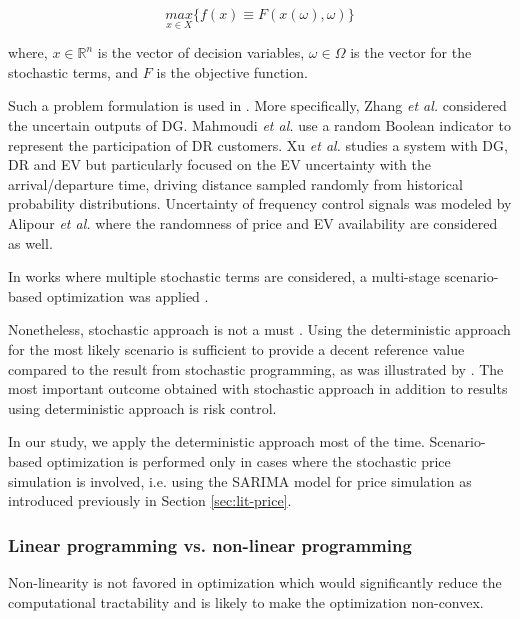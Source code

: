 \begin{equation*}
\underset{x\in X}{max}\{ f(x) \equiv F(x(\omega),\omega)\}
\end{equation*}

where, $x \in \mathbb{R}^n$ is the vector of decision variables, $\omega \in  \Omega$ is the vector for the stochastic terms, and $F$ is the objective function. 

Such a problem formulation is used in \cite{Zhang2016,Alipour2017,Mahmoudi2017,Xu2017,Han2017,Calvillo2016,Mahmoudi2014}. More specifically, Zhang \textit{et al.} \cite{Zhang2016} considered the uncertain outputs of DG. Mahmoudi \textit{et al.} \cite{Mahmoudi2017} use a random Boolean indicator to represent the participation of DR customers. Xu \textit{et al.} \cite{Xu2017} studies a system with DG, DR and EV but particularly focused on the EV uncertainty with the arrival/departure time, driving distance sampled randomly from historical probability distributions. Uncertainty of frequency control signals was modeled by Alipour \textit{et al.} \cite{Alipour2017} where the randomness of price and EV availability are considered as well. 

In works where multiple stochastic terms are considered, a multi-stage scenario-based optimization was applied \cite{Alipour2017,Han2017}.

Nonetheless, stochastic approach is not a must \cite{Zucker2013}. Using the deterministic approach for the most likely scenario is sufficient to provide a decent reference value compared to the result from stochastic programming, as was illustrated by \cite{Calvillo2016}. The most important outcome obtained with stochastic approach in addition to results using deterministic approach is risk control. 

In our study, we apply the deterministic approach most of the time. Scenario-based optimization is performed only in cases where the stochastic price simulation is involved, i.e. using the SARIMA model for price simulation as introduced previously in Section \ref{sec:lit-price}.

\subsubsection{Linear programming vs. non-linear programming}

Non-linearity is not favored in optimization which would significantly reduce the computational tractability and is likely to make the optimization non-convex.

